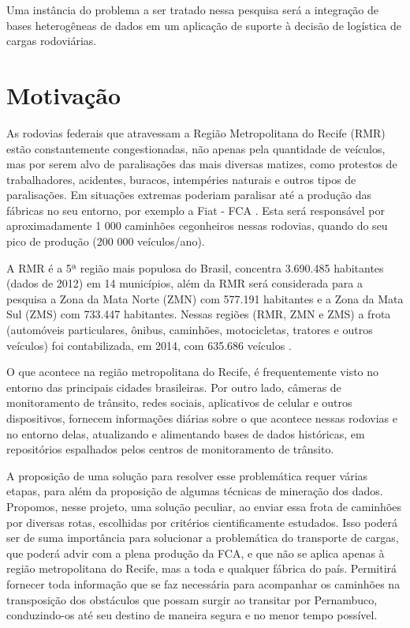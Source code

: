 Uma instância do problema a ser tratado nessa pesquisa será a integração de bases heterogêneas de dados em um aplicação de suporte à decisão de logística de cargas rodoviárias.


\section{Motivação}\label{intro:motivacao}

As rodovias federais que atravessam a Região Metropolitana do Recife (RMR) estão constantemente congestionadas, não apenas pela 
quantidade de veículos, mas por serem alvo de paralisações das mais diversas matizes, como protestos de trabalhadores, acidentes, 
buracos, intempéries naturais e outros tipos de paralisações. 
Em situações extremas poderiam paralisar até a produção das fábricas no seu entorno, por exemplo a Fiat - FCA \cite{BNDES2013}. 
Esta será responsável por aproximadamente 1 000 caminhões cegonheiros nessas rodovias, quando do seu pico de produção (200 000 veículos/ano).

A RMR é a 5ª região mais populosa do Brasil, concentra 3.690.485 habitantes (dados de 2012) \cite{Bitoun2012} em 14 municípios, além da RMR 
será considerada para a pesquisa a Zona da Mata Norte (ZMN) com 577.191 habitantes e a Zona da Mata Sul (ZMS) com 733.447 habitantes. 
Nessas regiões (RMR, ZMN e ZMS) a frota (automóveis particulares, ônibus, caminhões, motocicletas, tratores e outros veículos) 
foi contabilizada, em 2014, com 635.686 veículos \cite{FrotaVeiculosIBGE}.

O que acontece na região metropolitana do Recife, é frequentemente visto no entorno das principais cidades brasileiras.
Por outro lado, câmeras de monitoramento de trânsito, redes sociais, aplicativos de celular e outros dispositivos, fornecem informações diárias sobre o que acontece nessas 
rodovias e no entorno delas, atualizando e alimentando bases de dados históricas, em repositórios espalhados pelos centros de monitoramento de trânsito.

A proposição de uma solução para resolver esse problemática requer várias etapas, para além da proposição de algumas técnicas de mineração dos dados.
Propomos, nesse projeto, uma solução peculiar, ao enviar essa frota de caminhões por diversas rotas, escolhidas por critérios cientificamente estudados.
Isso poderá ser de suma importância para solucionar a problemática do transporte de cargas, que poderá advir com a plena produção da FCA, e que não se aplica apenas 
à região metropolitana do Recife, mas a toda e qualquer fábrica do país. Permitirá fornecer toda informação que se faz necessária para acompanhar os
caminhões na transposição dos obstáculos que possam surgir ao transitar por Pernambuco, conduzindo-os até seu destino de maneira segura e no menor tempo possível.


